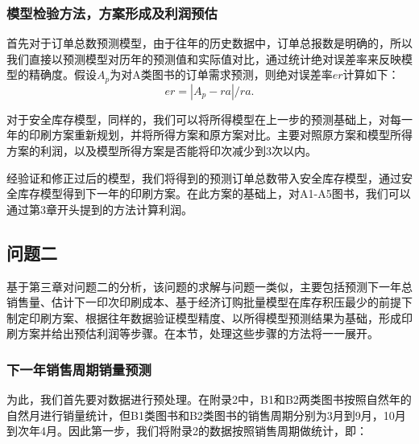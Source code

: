 \documentclass[bwprint]{gmcmthesis}
\begin{document}

\subsubsection{模型检验方法，方案形成及利润预估}

首先对于订单总数预测模型，由于往年的历史数据中，订单总报数是明确的，所以我们直接以预测模型对历年的预测值和实际值对比，通过统计绝对误差率来反映模型的精确度。假设$A_p$为对A类图书的订单需求预测，则绝对误差率$er$计算如下：
\begin{equation}
\label{eq:er}
  er = |A_p-ra|/ra.
\end{equation}

对于安全库存模型，同样的，我们可以将所得模型在上一步的预测基础上，对每一年的印刷方案重新规划，并将所得方案和原方案对比。主要对照原方案和模型所得方案的利润，以及模型所得方案是否能将印次减少到3次以内。

经验证和修正过后的模型，我们将得到的预测订单总数带入安全库存模型，通过安全库存模型得到下一年的印刷方案。在此方案的基础上，对A1-A5图书，我们可以通过第3章开头提到的方法计算利润。

\subsection{问题二}

基于第三章对问题二的分析，该问题的求解与问题一类似，主要包括预测下一年总销售量、估计下一印次印刷成本、基于经济订购批量模型在库存积压最少的前提下制定印刷方案、根据往年数据验证模型精度、以所得模型预测结果为基础，形成印刷方案并给出预估利润等步骤。在本节，处理这些步骤的方法将一一展开。

\subsubsection{下一年销售周期销量预测}

为此，我们首先要对数据进行预处理。在附录2中，B1和B2两类图书按照自然年的自然月进行销量统计，但B1类图书和B2类图书的销售周期分别为3月到9月，10月到次年4月。因此第一步，我们将附录2的数据按照销售周期做统计，即：
\end{document}
